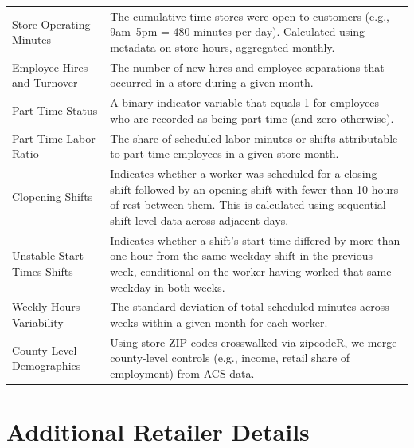 \documentclass[letterpaper,11pt,leqno]{article}
\theoremstyle{paper}
\begin{document}
\begin{table}[H]
\begin{tabular}{p{5cm}p{11cm}}
Store Operating Minutes & The cumulative time stores were open to customers (e.g., 9am–5pm = 480 minutes per day). Calculated using metadata on store hours, aggregated monthly. \\[6pt]

Employee Hires and Turnover & The number of new hires and employee separations that occurred in a store during a given month. \\[6pt]

Part-Time Status & A binary indicator variable that equals 1 for employees who are recorded as being part-time (and zero otherwise).  \\[6pt]

Part-Time Labor Ratio & The share of scheduled labor minutes or shifts attributable to part-time employees in a given store-month.  \\[6pt]

Clopening Shifts & Indicates whether a worker was scheduled for a closing shift followed by an opening shift with fewer than 10 hours of rest between them. This is calculated using sequential shift-level data across adjacent days. \\[6pt]

Unstable Start Times Shifts & Indicates whether a shift's start time differed by more than one hour from the same weekday shift in the previous week, conditional on the worker having worked that same weekday in both weeks.  \\[6pt]

Weekly Hours Variability & The standard deviation of total scheduled minutes across weeks within a given month for each worker. \\[6pt]





County-Level Demographics & Using store ZIP codes crosswalked via zipcodeR, we merge county-level controls (e.g., income, retail share of employment) from ACS data. \\[6pt]

\bottomrule
\end{tabular}
\label{table:variable_definitions}
\end{table}

\pagebreak 

\section{Additional Retailer Details} \label{sec:retailer_details}
\end{document}

